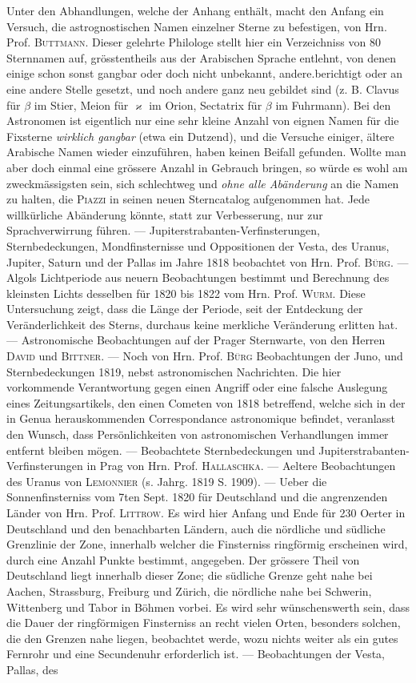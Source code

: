 Unter den Abhandlungen, welche der Anhang enthält, macht den Anfang ein Versuch, die astrognostischen Namen einzelner Sterne zu befestigen, von Hrn. Prof. \textsc{Buttmann}. Dieser gelehrte Philologe  stellt hier ein Verzeichniss von 80 Sternnamen auf, grösstentheils aus der Arabischen Sprache entlehnt, von denen einige schon sonst gangbar oder doch nicht unbekannt, andere.berichtigt oder an eine andere Stelle gesetzt, und noch andere ganz neu gebildet sind (z. B. Clavus für $\beta$ im Stier, Meion für $\varkappa$ im Orion, 
Sectatrix für $\beta$ im Fuhrmann). Bei den Astronomen ist eigentlich nur eine sehr kleine Anzahl von eignen Namen für die Fixsterne \emph{wirklich gangbar} (etwa ein Dutzend), und die Versuche einiger, ältere Arabische Namen wieder einzuführen, haben keinen Beifall gefunden. Wollte man aber doch einmal eine grössere Anzahl in Gebrauch bringen, so würde es wohl am zweckmässigsten sein, sich schlechtweg und \emph{ohne alle Abänderung} an die Namen zu halten, die \textsc{Piazzi} in seinen neuen Sterncatalog aufgenommen hat. Jede willkürliche Abänderung könnte, statt zur Verbesserung, nur zur Sprachverwirrung führen. --- Jupiterstrabanten-Verfinsterungen, Sternbedeckungen, Mondfinsternisse und Oppositionen der Vesta, des Uranus, Jupiter, Saturn und der Pallas im Jahre 1818 beobachtet von Hrn. Prof. \textsc{Bürg}. --- Algols Lichtperiode aus neuern Beobachtungen bestimmt und Berechnung des kleinsten Lichts desselben für 1820 bis 1822 vom Hrn. Prof. \textsc{Wurm}. Diese Untersuchung zeigt, dass die Länge der Periode, seit der Entdeckung der Veränderlichkeit des Sterns, durchaus keine merkliche Veränderung erlitten hat. --- Astronomische Beobachtungen auf der Prager Sternwarte, von den Herren \textsc{David} und \textsc{Bittner}. --- Noch von Hrn. Prof. \textsc{Bürg} Beobachtungen der Juno, und Sternbedeckungen 1819, nebst astronomischen Nachrichten. Die hier vorkommende Verantwortung gegen einen Angriff oder eine falsche Auslegung eines Zeitungsartikels, den einen Cometen von 1818 betreffend, welche sich in der in Genua herauskommenden Correspondance astronomique befindet, veranlasst den Wunsch, dass Persönlichkeiten von astronomischen Verhandlungen immer entfernt bleiben mögen. --- Beobachtete Sternbedeckungen und Jupiterstrabanten-Verfinsterungen in Prag von Hrn. Prof. \textsc{Hallaschka}. --- Aeltere Beobachtungen des Uranus von \textsc{Lemonnier} (s. Jahrg. 1819 S. 1909). --- Ueber die Sonnenfinsterniss vom 7ten Sept. 1820 für Deutschland und die angrenzenden Länder von Hrn. Prof. \textsc{Littrow}. Es wird hier Anfang und Ende für 230 Oerter in Deutschland und den benachbarten Ländern, auch die nördliche und südliche Grenzlinie der Zone, innerhalb welcher die Finsterniss ringförmig erscheinen wird, durch eine Anzahl Punkte bestimmt, angegeben. Der grössere Theil von Deutschland liegt innerhalb dieser Zone; die südliche Grenze geht nahe bei Aachen, Strassburg, Freiburg und Zürich, die nördliche nahe bei Schwerin, Wittenberg und Tabor in Böhmen vorbei. Es wird sehr wünschenswerth sein, dass die Dauer der ringförmigen Finsterniss an recht vielen Orten, besonders solchen, die den Grenzen nahe liegen, beobachtet werde, wozu nichts weiter als ein gutes Fernrohr und eine Secundenuhr erforderlich ist. --- Beobachtungen der Vesta, Pallas, des 